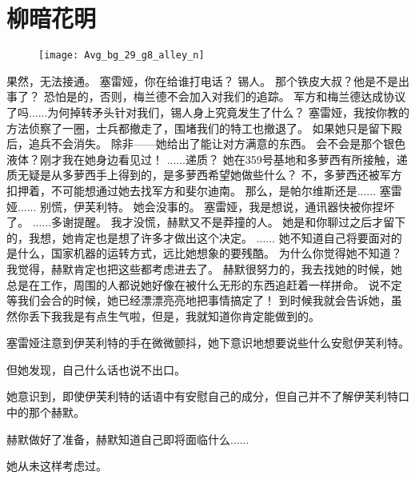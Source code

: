 \documentclass[openany]{book}
\begin{document}
\chapter{柳暗花明}
\begin{figure}[h]
    \centering
    \texttt{[image: Avg\_bg\_29\_g8\_alley\_n]}
\end{figure}
\begin{dialogue}
     果然，无法接通。
     塞雷娅，你在给谁打电话？
     锡人。
     那个铁皮大叔？他是不是出事了？
     恐怕是的，否则，梅兰德不会加入对我们的追踪。
     军方和梅兰德达成协议了吗......为何掉转矛头针对我们，锡人身上究竟发生了什么？
     塞雷娅，我按你教的方法侦察了一圈，士兵都撤走了，围堵我们的特工也撤退了。
     如果她只是留下殿后，追兵不会消失。
     除非——她给出了能让对方满意的东西。
     会不会是那个银色液体？刚才我在她身边看见过！
     ......递质？
     她在359号基地和多萝西有所接触，递质无疑是从多萝西手上得到的，是多萝西希望她做些什么？
     不，多萝西还被军方扣押着，不可能想通过她去找军方和斐尔迪南。
     那么，是帕尔维斯还是......
     塞雷娅......
     别慌，伊芙利特。
     她会没事的。
     塞雷娅，我是想说，通讯器快被你捏坏了。
     ......多谢提醒。
     我才没慌，赫默又不是莽撞的人。
     她是和你聊过之后才留下的，我想，她肯定也是想了许多才做出这个决定。
     ......
     她不知道自己将要面对的是什么，国家机器的运转方式，远比她想象的要残酷。
     为什么你觉得她不知道？我觉得，赫默肯定也把这些都考虑进去了。
     赫默很努力的，我去找她的时候，她总是在工作，周围的人都说她好像在被什么无形的东西追赶着一样拼命。
     说不定等我们会合的时候，她已经漂漂亮亮地把事情搞定了！
     到时候我就会告诉她，虽然你丢下我我是有点生气啦，但是，我就知道你肯定能做到的。
\end{dialogue}

\par
塞雷娅注意到伊芙利特的手在微微颤抖，她下意识地想要说些什么安慰伊芙利特。\par
但她发现，自己什么话也说不出口。\par
她意识到，即使伊芙利特的话语中有安慰自己的成分，但自己并不了解伊芙利特口中的那个赫默。\par
赫默做好了准备，赫默知道自己即将面临什么......\par
她从未这样考虑过。\par
\end{document}
